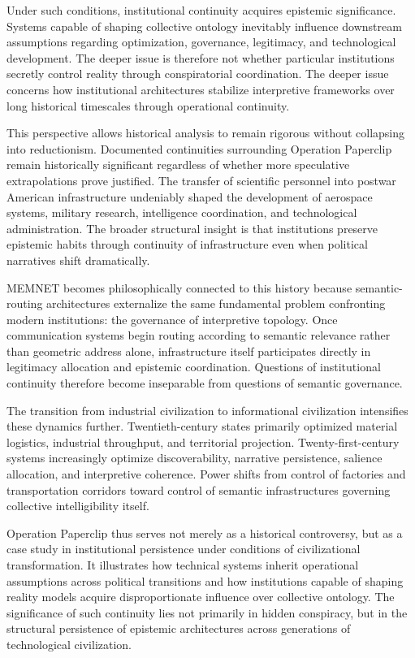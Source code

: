 \documentclass[11pt,a4paper]{article}
\begin{document}
Under such conditions, institutional continuity acquires epistemic significance. Systems capable of shaping collective ontology inevitably influence downstream assumptions regarding optimization, governance, legitimacy, and technological development. The deeper issue is therefore not whether particular institutions secretly control reality through conspiratorial coordination. The deeper issue concerns how institutional architectures stabilize interpretive frameworks over long historical timescales through operational continuity.

This perspective allows historical analysis to remain rigorous without collapsing into reductionism. Documented continuities surrounding Operation Paperclip remain historically significant regardless of whether more speculative extrapolations prove justified. The transfer of scientific personnel into postwar American infrastructure undeniably shaped the development of aerospace systems, military research, intelligence coordination, and technological administration. The broader structural insight is that institutions preserve epistemic habits through continuity of infrastructure even when political narratives shift dramatically.

MEMNET becomes philosophically connected to this history because semantic-routing architectures externalize the same fundamental problem confronting modern institutions: the governance of interpretive topology. Once communication systems begin routing according to semantic relevance rather than geometric address alone, infrastructure itself participates directly in legitimacy allocation and epistemic coordination. Questions of institutional continuity therefore become inseparable from questions of semantic governance.

The transition from industrial civilization to informational civilization intensifies these dynamics further. Twentieth-century states primarily optimized material logistics, industrial throughput, and territorial projection. Twenty-first-century systems increasingly optimize discoverability, narrative persistence, salience allocation, and interpretive coherence. Power shifts from control of factories and transportation corridors toward control of semantic infrastructures governing collective intelligibility itself.

Operation Paperclip thus serves not merely as a historical controversy, but as a case study in institutional persistence under conditions of civilizational transformation. It illustrates how technical systems inherit operational assumptions across political transitions and how institutions capable of shaping reality models acquire disproportionate influence over collective ontology. The significance of such continuity lies not primarily in hidden conspiracy, but in the structural persistence of epistemic architectures across generations of technological civilization.
\end{document}
